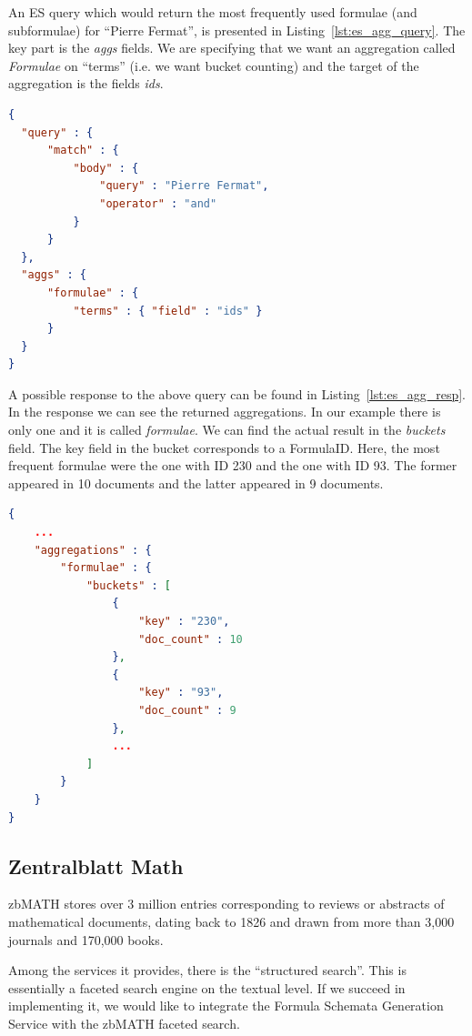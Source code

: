 \documentclass[a4paper,11pt,oneside]{article}
\begin{document}
An ES query which would return the most frequently used formulae (and
subformulae) for ``Pierre Fermat'', is presented in Listing~\ref{lst:es_agg_query}.
The key part is the \emph{aggs} fields. We are specifying that we want an
aggregation called \textit{Formulae} on ``terms'' (i.e. we want bucket
counting) and the target of the aggregation is the fields \emph{ids}.

\begin{lstlisting}[language=json,firstnumber=1,caption=Elastic Search Term
Aggregation Query, captionpos=b, label=lst:es_agg_query]
{
  "query" : {
      "match" : {
          "body" : {
              "query" : "Pierre Fermat",
              "operator" : "and"
          }
      }
  },
  "aggs" : {
      "formulae" : {
          "terms" : { "field" : "ids" }
      }
  }
}
\end{lstlisting}

A possible response to the above query can be found in
Listing~\ref{lst:es_agg_resp}. In the response we can see the returned
aggregations. In our example there is only one and it is called
\emph{formulae}. We can find the actual result in the \emph{buckets} field. The
\textsf{key} field in the bucket corresponds to a \textsf{FormulaID}.
Here, the most frequent formulae were the one with ID 230 and the one with ID
93. The former appeared in 10 documents and the latter appeared in 9 documents.

\begin{lstlisting}[language=json,firstnumber=1,caption=Elastic Search Term
Aggregation Response, captionpos=b, label=lst:es_agg_resp]
{
    ...
    "aggregations" : {
        "formulae" : {
            "buckets" : [ 
                {
                    "key" : "230",
                    "doc_count" : 10
                },
                {
                    "key" : "93",
                    "doc_count" : 9
                },
                ...
            ]
        }
    }
}
\end{lstlisting}

\subsection{Zentralblatt Math}\label{subsec:zblatt}
\textsf{zbMATH} stores over 3 million entries corresponding to reviews or
abstracts of mathematical documents, dating back to 1826 and drawn from more
than 3,000 journals and 170,000 books\cite{zbmathabout:online}.

Among the services it provides, there is the ``structured search''.
This is essentially a faceted search engine on the textual level.
If we succeed in implementing it, we would like to integrate the 
Formula Schemata Generation Service with the zbMATH faceted search.
\end{document}
